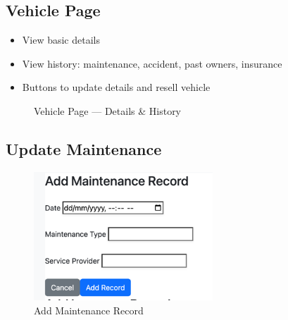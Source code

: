 \documentclass[12pt,a4paper]{article}
\begin{document}
    \subsection{Vehicle Page}
    \begin{itemize}
        \item View basic details
        \item View history: maintenance, accident, past owners, insurance
        \item Buttons to update details and resell vehicle
    \end{itemize}
    \begin{figure}[H]
        \centering
        \quad
        \caption{Vehicle Page — Details \& History}
        \label{fig:vehicle-details}
    \end{figure}

    \subsection{Update Maintenance}
    \begin{figure}[H]
        \centering
        \includegraphics[width=0.6\textwidth]{screenshots/vehicle - add maintenance.png}
        \caption{Add Maintenance Record}
        \label{fig:update-maintenance}
    \end{figure}
\end{document}
